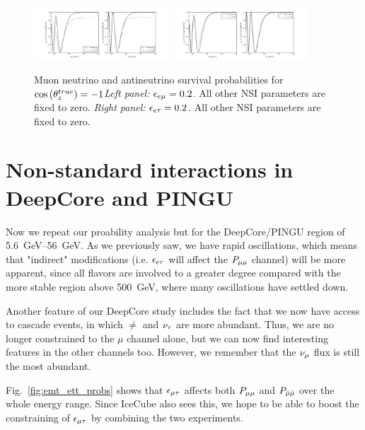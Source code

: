 \documentclass{thesis}
\begin{document}
\begin{figure}\label{fig:eem_eet_probs}
    \begin{center}
        \includegraphics[width=0.45\textwidth]{figures/eem_probs.pdf}
        \includegraphics[width=0.45\textwidth]{figures/eet_probs.pdf}
        \caption{Muon neutrino and antineutrino survival probabilities for
        $\cos{(\theta_z^{true})} = -1$\emph{Left panel:} $\epsilon_{e\mu} = 0.2$. All other NSI parameters are fixed to zero.
        \emph{Right panel:} $\epsilon_{e\tau} = 0.2$. All other NSI parameters are fixed to zero.}
    \end{center}
\end{figure}


\section{Non-standard interactions in DeepCore and PINGU}
Now we repeat our proability analysis but for the DeepCore/PINGU region of \SIrange{5.6}{56}{\GeV}. As we previously saw,
we have rapid oscillations, which means that "indirect" modifications (i.e. $\epsilon_{e\tau}$ will affect the $P_{\mu\mu}$ channel)
will be more apparent, since all flavors are involved to a greater degree compared with the more stable region above \SI{500}{\GeV}, where 
many oscillations have settled down.

Another feature of our DeepCore study includes the fact that we now have access to cascade events, in which $\ne$ and $\nu_\tau$ are more abundant. %
Thus, we are no longer constrained to the $\mu$ channel alone, but we can now find interesting features in the other channels too. However, we 
remember that the $\nu_\mu$ flux is still the most abundant. %

Fig.~\ref{fig:emt_ett_probs} shows that $\epsilon_{\mu\tau}$ affects both $P_{\mu\mu}$ and $P_{\bar{\mu} \bar{\mu}}$ over the whole energy range. Since 
IceCube also sees this, we hope to be able to boost the constraining of $\epsilon_{\mu\tau}$ by combining the two experiments.
\end{document}
